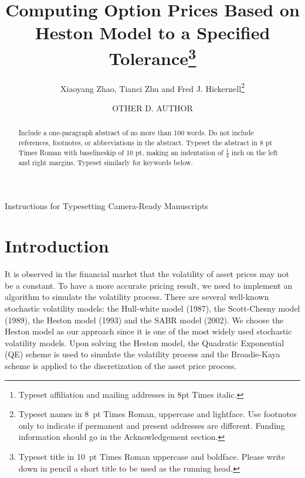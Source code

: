 \documentclass{ws-ijfe}
\begin{document}
{Instructions for Typesetting Camera-Ready Manuscripts}

\catchline{}{}{}{}{}

\title{Computing Option Prices Based on Heston Model to a Specified Tolerance\footnote{Typeset title in
10~pt Times Roman uppercase and boldface. Please write
down in pencil a short title to be used as the running head.}}

\author{Xiaoyang Zhao, Tianci Zhu and Fred J. Hickernell\footnote{Typeset names in 8~pt Times Roman, uppercase and lightface.  Use footnotes only to indicate if permanent and present addresses are different. Funding information should go in the Acknowledgement section.}}

\address{Full affiliations\footnote{Typeset
affiliation and mailing addresses in 8pt Times italic.} \\
,mailing addresses and telephone number}

\author{OTHER D. AUTHOR}

\address{Full affiliations \\
,mailing addresses and telephone number}

\maketitle

\begin{abstract}
Include a one-paragraph abstract of no more than 100 words. Do not include references, footnotes, or abbreviations in the abstract. Typeset the
abstract in 8 pt Times Roman with baselineskip of 10 pt, making
an indentation of $\frac14$ inch on the left and right margins.
Typeset similarly for keywords below.
\end{abstract}


\section{Introduction}

It is observed in the financial market that the volatility of asset prices may not be a constant. To have a more accurate pricing result, we need to implement an algorithm to simulate the volatility process. There are several well-known stochastic volatility models: the Hull-white model (1987), the Scott-Chesny model (1989), the Heston model (1993) and the SABR model (2002). We choose the Heston model as our approach since it is one of the most widely used stochastic volatility models. Upon solving the Heston model, the Quadratic Exponential (QE) scheme is used to simulate the volatility process and the Broadie-Kaya scheme is applied to the discretization of the asset price process.
\end{document}
